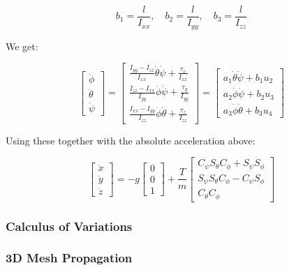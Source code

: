 $$b_{1}=\frac{l}{I_{x x}}, \quad b_{2}=\frac{l}{I_{y y}}, \quad b_{3}=\frac{l}{I_{z z}}$$

We get:

$$
\left[ \begin{array}{l}
\ddot{\phi} \\ \ddot{\theta} \\ \ddot{\psi} 
\end{array} \right] = 
\left[ \begin{array}{l}
\frac{I_{yy}-I_{zz}}{I_{xx}} \dot{\theta} \dot{\psi} + \frac{\tau_{x}}{I_{xx}} \\ 
\frac{I_{zz}-I_{xx}}{I_{yy}} \dot{\phi} \dot{\psi} + \frac{\tau_{y}}{I_{yy}} \\
\frac{I_{xx}-I_{yy}}{I_{zz}} \dot{\phi} \dot{\theta} + \frac{\tau_{z}}{I_{zz}} 
\end{array}\right]
=
\left[ \begin{array}{l}
a_1 \dot{\theta} \dot{\psi} + b_1 u_2 \\ 
a_2 \dot{\phi} \dot{\psi} + b_2 u_3 \\
a_3 \dot{\phi} \dot{\theta} + b_3 u_4
\end{array}\right]
$$

Using these together with the absolute acceleration above:

$$\left[ \begin{array}{c}{\ddot{x}} \\ {\ddot{y}} \\ {\ddot{z}}\end{array}\right]=-g \left[ \begin{array}{l}{0} \\ {0} \\ {1}\end{array}\right]+\frac{T}{m} \left[ \begin{array}{c}{C_{\psi} S_{\theta} C_{\phi}+S_{\psi} S_{\phi}} \\ {S_{\psi} S_{\theta} C_{\phi}-C_{\psi} S_{\phi}} \\ {C_{\theta} C_{\phi}}\end{array}\right]$$

\subsubsection{Calculus of Variations}
\label{sssec:3d_mesh_generation}

\subsubsection{3D Mesh Propagation}
